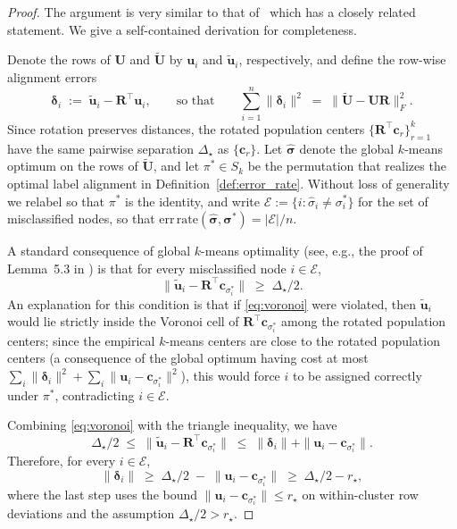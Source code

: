 \documentclass[11pt]{article}
\theoremstyle{plain}
\theoremstyle{definition}
\theoremstyle{remark}
\begin{document}
\begin{proof}
The argument is very similar to that of~\citep[Lemma~5.3,][]{lei2015consistency} which has a closely 
related statement. We give a self-contained derivation for completeness.

Denote the rows of $\mathbf{U}$ and $\widetilde{\mathbf{U}}$ by $\mathbf{u}_i$ and 
$\tilde{\mathbf{u}}_i$, respectively, and define the row-wise alignment errors
\[
\bm\delta_i \;:=\; \tilde{\mathbf{u}}_i - \mathbf{R}^\top \mathbf{u}_i,
\qquad \text{so that} \qquad
\sum_{i=1}^n \|\bm\delta_i\|^2 \;=\; \|\widetilde{\mathbf{U}} - \mathbf{U}\mathbf{R}\|_F^2.
\]
Since rotation preserves distances, the rotated population centers 
$\{\mathbf{R}^\top \mathbf{c}_r\}_{r=1}^k$ have the same pairwise separation $\Delta_\star$ 
as $\{\mathbf{c}_r\}$. Let $\hat{\bm\sigma}$ denote the global $k$-means optimum on the 
rows of $\widetilde{\mathbf{U}}$, and let $\pi^\ast \in S_k$ be the permutation that 
realizes the optimal label alignment in Definition~\ref{def:error_rate}. Without loss 
of generality we relabel so that $\pi^\ast$ is the identity, and write 
$\mathcal{E} := \{i : \hat{\sigma}_i \neq \sigma_i^\ast\}$ for the set of misclassified 
nodes, so that $\mathrm{err\,rate}(\hat{\bm\sigma}, \bm\sigma^\ast) = |\mathcal{E}|/n$.

A standard consequence of global $k$-means optimality (see, e.g., 
the proof of Lemma~5.3 in \citet{lei2015consistency}) is that for every misclassified 
node $i \in \mathcal{E}$,
\begin{equation}
\label{eq:voronoi}
\|\tilde{\mathbf{u}}_i - \mathbf{R}^\top \mathbf{c}_{\sigma_i^\ast}\| \;\geq\; \Delta_\star/2.
\end{equation}
An explanation for this condition is that if \eqref{eq:voronoi} were violated, then $\tilde{\mathbf{u}}_i$ would lie 
strictly inside the Voronoi cell of $\mathbf{R}^\top \mathbf{c}_{\sigma_i^\ast}$ among 
the rotated population centers; since the empirical $k$-means centers are close to the 
rotated population centers (a consequence of the global optimum having cost at most 
$\sum_i \|\bm\delta_i\|^2 + \sum_i \|\mathbf{u}_i - \mathbf{c}_{\sigma_i^\ast}\|^2$), this 
would force $i$ to be assigned correctly under $\pi^\ast$, contradicting $i \in \mathcal{E}$.

Combining \eqref{eq:voronoi} with the triangle inequality, we have
\[
\Delta_\star/2 \;\leq\; \|\tilde{\mathbf{u}}_i - \mathbf{R}^\top \mathbf{c}_{\sigma_i^\ast}\|
\;\leq\; \|\bm\delta_i\| + \|\mathbf{u}_i - \mathbf{c}_{\sigma_i^\ast}\|.
\]
Therefore, for every $i \in \mathcal{E}$,
\[
\|\bm\delta_i\| \;\geq\; \Delta_\star/2 \;-\; \|\mathbf{u}_i - \mathbf{c}_{\sigma_i^\ast}\|
\;\geq\; \Delta_\star/2 - r_\star,
\]
where the last step uses the bound $\|\mathbf{u}_i - \mathbf{c}_{\sigma_i^\ast}\| \leq r_\star$ 
on within-cluster row deviations and the assumption $\Delta_\star/2 > r_\star$.


\end{proof}
\end{document}

